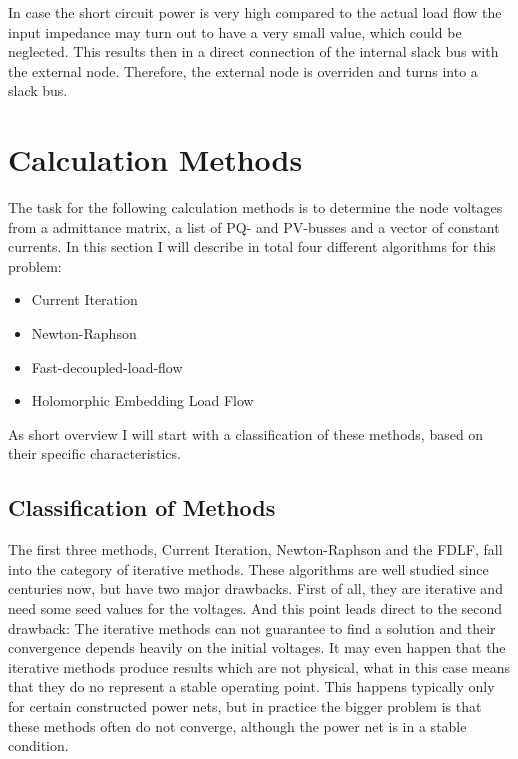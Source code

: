 In case the short circuit power is very high compared to the actual load flow the input impedance may turn out to have a very small value, which could be neglected. This results then in a direct connection of the internal slack bus with the external node. Therefore, the external node is overriden and turns into a slack bus.

\section{Calculation Methods}

The task for the following calculation methods is to determine the node voltages from a admittance matrix, a list of PQ- and PV-busses and a vector of constant currents. In this section I will describe in total four different algorithms for this problem:
\begin{itemize}
	\item Current Iteration \citep[p. 209]{powerSystemAnalysis}
	\item Newton-Raphson \citep[p. 232]{powerSystemAnalysis}
	\item Fast-decoupled-load-flow \citep[p. 240]{powerSystemAnalysis}
	\item Holomorphic Embedding Load Flow \citep{helmIEEE, helmPatentApr2009, helmPatentSept2009}
\end{itemize}

As short overview I will start with a classification of these methods, based on their specific characteristics.

\subsection{Classification of Methods}
The first three methods, Current Iteration, Newton-Raphson and the FDLF, fall into the category of iterative methods. These algorithms are well studied since centuries now, but have two major drawbacks. First of all, they are iterative and need some seed values for the voltages. And this point leads direct to the second drawback: The iterative methods can not guarantee to find a solution and their convergence depends heavily on the initial voltages. It may even happen that the iterative methods produce results which are not physical, what in this case means that they do no represent a stable operating point. This happens typically only for certain constructed power nets, but in practice the bigger problem is that these methods often do not converge, although the power net is in a stable condition.

